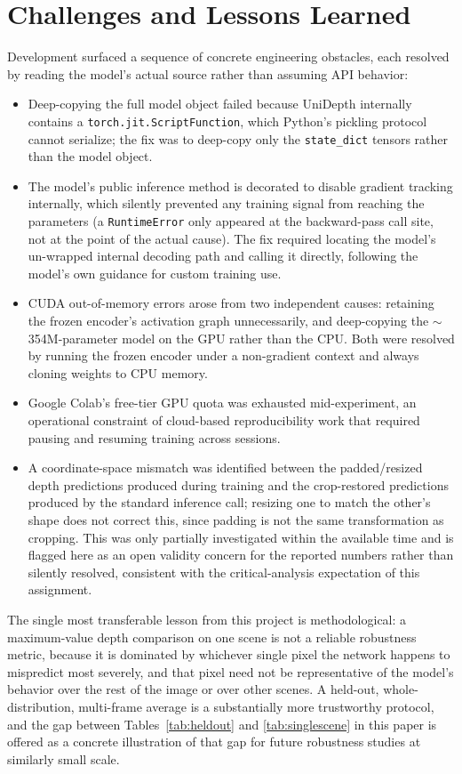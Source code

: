 \documentclass[conference]{IEEEtran}
\begin{document}
\section{Challenges and Lessons Learned}
\label{sec:challenges}

Development surfaced a sequence of concrete engineering obstacles, each resolved by reading the model's actual source rather than assuming API behavior:

\begin{itemize}
\item Deep-copying the full model object failed because UniDepth internally contains a \texttt{torch.jit.ScriptFunction}, which Python's pickling protocol cannot serialize; the fix was to deep-copy only the \texttt{state\_dict} tensors rather than the model object.
\item The model's public inference method is decorated to disable gradient tracking internally, which silently prevented any training signal from reaching the parameters (a \texttt{RuntimeError} only appeared at the backward-pass call site, not at the point of the actual cause). The fix required locating the model's un-wrapped internal decoding path and calling it directly, following the model's own guidance for custom training use.
\item CUDA out-of-memory errors arose from two independent causes: retaining the frozen encoder's activation graph unnecessarily, and deep-copying the $\sim$354M-parameter model on the GPU rather than the CPU. Both were resolved by running the frozen encoder under a non-gradient context and always cloning weights to CPU memory.
\item Google Colab's free-tier GPU quota was exhausted mid-experiment, an operational constraint of cloud-based reproducibility work that required pausing and resuming training across sessions.
\item A coordinate-space mismatch was identified between the padded/resized depth predictions produced during training and the crop-restored predictions produced by the standard inference call; resizing one to match the other's shape does not correct this, since padding is not the same transformation as cropping. This was only partially investigated within the available time and is flagged here as an open validity concern for the reported numbers rather than silently resolved, consistent with the critical-analysis expectation of this assignment.
\end{itemize}

The single most transferable lesson from this project is methodological: a maximum-value depth comparison on one scene is not a reliable robustness metric, because it is dominated by whichever single pixel the network happens to mispredict most severely, and that pixel need not be representative of the model's behavior over the rest of the image or over other scenes. A held-out, whole-distribution, multi-frame average is a substantially more trustworthy protocol, and the gap between Tables~\ref{tab:heldout} and \ref{tab:singlescene} in this paper is offered as a concrete illustration of that gap for future robustness studies at similarly small scale.
\end{document}

